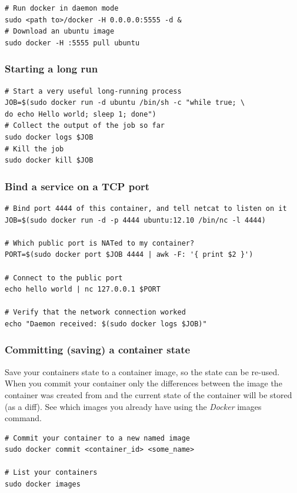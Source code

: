 \documentclass[11pt]{article}
\begin{document}
\begin{verbatim}
# Run docker in daemon mode
sudo <path to>/docker -H 0.0.0.0:5555 -d &
# Download an ubuntu image
sudo docker -H :5555 pull ubuntu
\end{verbatim}
\subsubsection{Starting a long run}
\label{sec-2-2-5}


\begin{verbatim}
# Start a very useful long-running process
JOB=$(sudo docker run -d ubuntu /bin/sh -c "while true; \
do echo Hello world; sleep 1; done")
# Collect the output of the job so far
sudo docker logs $JOB
# Kill the job
sudo docker kill $JOB
\end{verbatim}
\subsubsection{Bind a service on a TCP port}
\label{sec-2-2-6}


\begin{verbatim}
# Bind port 4444 of this container, and tell netcat to listen on it
JOB=$(sudo docker run -d -p 4444 ubuntu:12.10 /bin/nc -l 4444)

# Which public port is NATed to my container?
PORT=$(sudo docker port $JOB 4444 | awk -F: '{ print $2 }')

# Connect to the public port
echo hello world | nc 127.0.0.1 $PORT

# Verify that the network connection worked
echo "Daemon received: $(sudo docker logs $JOB)"
\end{verbatim}
\subsubsection{Committing (saving) a container state}
\label{sec-2-2-7}

Save your containers state to a container image, so the state can be re-used.
When you commit your container only the differences between the image the container was created from and the current state of the container will be stored (as a diff). See which images you already have using the \emph{Docker} images command.

\begin{verbatim}
# Commit your container to a new named image
sudo docker commit <container_id> <some_name>

# List your containers
sudo docker images
\end{verbatim}
\end{document}
